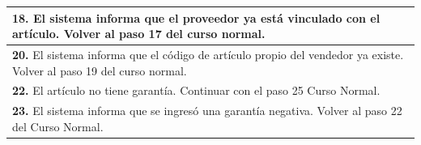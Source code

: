 \documentclass[12pt]{extarticle}
\begin{document}
\begin{spacing}{1.2}
\begin{longtable}{ |p{8cm}|p{8cm}| }
    \hline
    \multicolumn{2}{|p{16cm}|}{\textbf{18. }El sistema informa que el proveedor ya está vinculado con el artículo. Volver al paso 17 del curso normal.}\\
    \hline
    \multicolumn{2}{|p{16cm}|}{\textbf{20. }El sistema informa que el código de artículo propio del vendedor ya existe. Volver al paso 19 del curso normal.}\\
    \hline
    \multicolumn{2}{|p{16cm}|}{\textbf{22. }El artículo no tiene garantía. Continuar con el paso 25 Curso Normal.}\\
    \hline
    \multicolumn{2}{|p{16cm}|}{\textbf{23. }El sistema informa que se ingresó una garantía negativa. Volver al paso 22 del Curso Normal.}\\
    \hline
\end{longtable}

\raya
\resetinc


\end{spacing}
\end{document}
